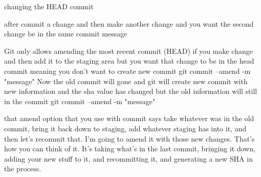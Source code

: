 changing the HEAD commit 

  after commit a change and then make another change and you want the second change be in the same commit message 

  Git only allows amending the most recent commit (HEAD)
  if you make change and then add it to the staging area 
  but you want that change to be in the head commit meaning you don't want to create new commit 
  git commit --amend -m "message"
  Now the old commit will gone and git will create new commit with new information and the sha value has changed but the old information will still in the commit  
  git commit --amend -m "message"  

  that amend option that you use with commit says take whatever was in the old commit, bring it back down to staging, add whatever staging has into it, and then let's recommit that.
  I'm going to amend it with those new changes. That's how you can think of it. It's taking what's in the last commit, bringing it down, adding your new stuff to it, and recommitting it, and generating a new SHA in the process.